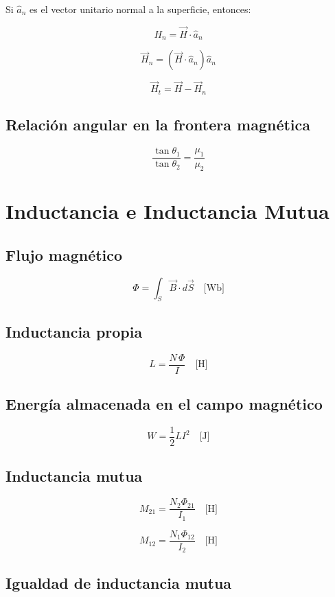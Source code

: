 \documentclass[11pt]{article}
\begin{document}
\begin{multicols}{2}
Si \( \hat{a}_n \) es el vector unitario normal a la superficie, entonces:

\[
H_n = \vec{H} \cdot \hat{a}_n
\]

\[
\vec{H}_n = \left( \vec{H} \cdot \hat{a}_n \right) \hat{a}_n
\]

\[
\vec{H}_t = \vec{H} - \vec{H}_n
\]

\subsection*{Relación angular en la frontera magnética}

\[
\frac{\tan\theta_1}{\tan\theta_2} = \frac{\mu_1}{\mu_2}
\]


\section*{Inductancia e Inductancia Mutua}

\subsection*{Flujo magnético}

\[
\Phi = \int_S \vec{B} \cdot d\vec{S}
\quad\text{[Wb]}
\]

\subsection*{Inductancia propia}

\[
L = \frac{N \, \Phi}{I}
\quad\text{[H]}
\]


\subsection*{Energía almacenada en el campo magnético}

\[
W = \frac{1}{2} L I^2
\quad\text{[J]}
\]

\subsection*{Inductancia mutua}

\[
M_{21} = \frac{N_2 \Phi_{21}}{I_1}
\quad\text{[H]}
\]

\[
M_{12} = \frac{N_1 \Phi_{12}}{I_2}
\quad\text{[H]}
\]

\subsection*{Igualdad de inductancia mutua}


\end{multicols}
\end{document}
